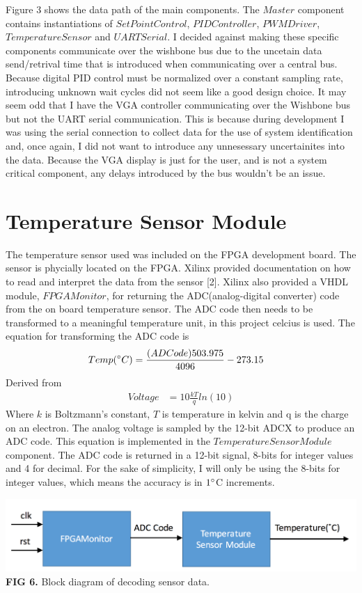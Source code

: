 \documentclass{article}
\begin{document}
Figure 3 shows the data path of the main components. The $Master$ component contains instantiations of $SetPointControl$, $PIDController$, $PWMDriver$, $TemperatureSensor$ and $UARTSerial$. I decided against making these specific components communicate over the wishbone bus due to the uncetain data send/retrival time that is introduced when communicating over a central bus. Because digital PID control must be normalized over a constant sampling rate, introducing unknown wait cycles did not seem like a good design choice. It may seem odd that I have the VGA controller communicating over the Wishbone bus but not the UART serial communication. This is because during development I was using the serial connection to collect data for the use of system identification and, once again, I did not want to introduce any unnesessary uncertainites into the data. Because the VGA display is just for the user, and is not a system critical component, any delays introduced by the bus wouldn't be an issue.

\section{Temperature Sensor Module}
The temperature sensor used was included on the FPGA development board. The sensor is phycially located on the FPGA. Xilinx provided documentation on how to read and interpret the data from the sensor [2]. Xilinx also provided a VHDL module, $FPGAMonitor$, for returning the ADC(analog-digital converter) code from the on board temperature sensor. The ADC code then needs to be transformed to a meaningful temperature unit, in this project celcius is used. The equation for transforming the ADC code is
\begin{align*}
Temp(\degree C) &= \frac{(ADCode)503.975}{4096}-273.15
\end{align*}
Derived from
\begin{align*}
Voltage &= 10\frac{kT}{q}ln(10)
\end{align*}
Where $k$ is Boltzmann's constant, $T$ is temperature in kelvin and q is the charge on an electron. The analog voltage is sampled by the 12-bit ADCX to produce an ADC code.
 This equation is implemented in the $TemperatureSensorModule$ component. The ADC code is returned in a 12-bit signal, 8-bits for integer values and 4 for decimal. For the sake of simplicity, I will only be using the 8-bits for integer values, which means the accuracy is in $1 \degree$C increments.
\begin{center}
\includegraphics[scale=.5]{images/sensorM}\\
\textbf{FIG 6.} Block diagram of decoding sensor data.\\
\end{center}
\end{document}
